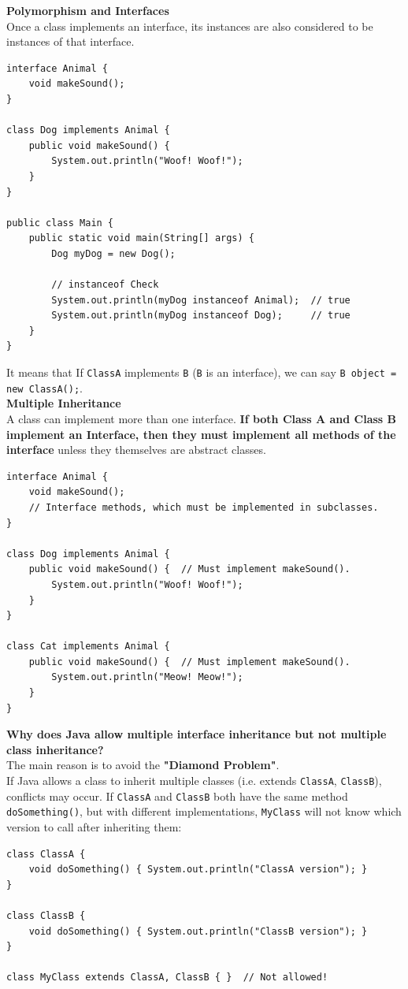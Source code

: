 \documentclass[letterpaper,12pt]{article}
\begin{document}
\textbf{Polymorphism and Interfaces}\\
Once a class implements an interface, its instances are also considered to be instances of that interface.
\begin{verbatim}
interface Animal {
    void makeSound();
}

class Dog implements Animal {
    public void makeSound() {
        System.out.println("Woof! Woof!");
    }
}

public class Main {
    public static void main(String[] args) {
        Dog myDog = new Dog();

        // instanceof Check
        System.out.println(myDog instanceof Animal);  // true
        System.out.println(myDog instanceof Dog);     // true
    }
}
\end{verbatim}
It means that If \texttt{ClassA} implements \texttt{B} (\texttt{B} is an interface), we can say \texttt{B object = new ClassA();}.\\
\textbf{Multiple Inheritance}\\
A class can implement more than one interface. \textbf{If both Class A and Class B implement an Interface, then they must implement all methods of the interface} unless they themselves are abstract classes.
\begin{verbatim}
interface Animal {
    void makeSound();
    // Interface methods, which must be implemented in subclasses.
}

class Dog implements Animal {
    public void makeSound() {  // Must implement makeSound().
        System.out.println("Woof! Woof!");
    }
}

class Cat implements Animal {
    public void makeSound() {  // Must implement makeSound().
        System.out.println("Meow! Meow!");
    }
}
\end{verbatim}
\textbf{Why does Java allow multiple interface inheritance but not multiple class inheritance?}\\
The main reason is to avoid the \textbf{"Diamond Problem"}.\\
If Java allows a class to inherit multiple classes (i.e. extends \texttt{ClassA}, \texttt{ClassB}), conflicts may occur. If \texttt{ClassA} and \texttt{ClassB} both have the same method \texttt{doSomething()}, but with different implementations, \texttt{MyClass} will not know which version to call after inheriting them:
\begin{verbatim}
class ClassA {
    void doSomething() { System.out.println("ClassA version"); }
}

class ClassB {
    void doSomething() { System.out.println("ClassB version"); }
}

class MyClass extends ClassA, ClassB { }  // Not allowed!
\end{verbatim}
\end{document}
